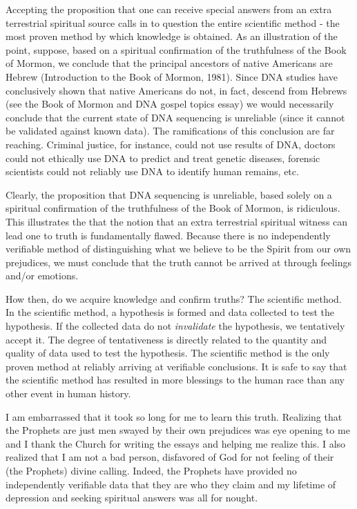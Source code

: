 \documentclass[a4paper]{article}
\begin{document}
Accepting the proposition that one can receive special answers from an extra terrestrial spiritual source calls in to question the entire scientific method - the most proven method by which knowledge is obtained.  As an illustration of the point, suppose, based on a spiritual confirmation of the truthfulness of the Book of Mormon, we conclude that the principal ancestors of native Americans are Hebrew (Introduction to the Book of Mormon, 1981).  Since DNA studies have conclusively shown that native Americans do not, in fact, descend from Hebrews (see the \textquotedbl{}Book of Mormon and DNA\textquotedbl{} gospel topics essay) we would necessarily conclude that the current state of DNA sequencing is unreliable (since it cannot be validated against \textquotedbl{}known\textquotedbl{} data).  The ramifications of this conclusion are far reaching.  Criminal justice, for instance, could not use results of DNA, doctors could not ethically use DNA to predict and treat genetic diseases, forensic scientists could not reliably use DNA to identify human remains, etc.

Clearly, the proposition that DNA sequencing is unreliable, based solely on a spiritual confirmation of the truthfulness of the Book of Mormon, is ridiculous.  This illustrates the that the notion that an extra terrestrial spiritual witness can lead one to truth is fundamentally flawed.  Because there is no independently verifiable method of distinguishing what we believe to be the Spirit from our own prejudices, we must conclude that the truth cannot be arrived at through feelings and/or emotions.

How then, do we acquire knowledge and confirm truths?  The scientific method.  In the scientific method, a hypothesis is formed and data collected to test the hypothesis.  If the collected data do not \emph{invalidate} the hypothesis, we tentatively accept it.  The degree of tentativeness is directly related to the quantity and quality of data used to test the hypothesis.  The scientific method is the only proven method at reliably arriving at verifiable conclusions.  It is safe to say that the scientific method has resulted in more blessings to the human race than any other event in human history.

I am embarrassed that it took so long for me to learn this truth.  Realizing that the Prophets are just men swayed by their own prejudices was eye opening to me and I thank the Church for writing the essays and helping me realize this.  I also realized that I am not a bad person, disfavored of God for not feeling of their (the Prophets) divine calling.  Indeed, the Prophets have provided no independently verifiable data that they are who they claim and my lifetime of depression and seeking spiritual answers was all for nought.
\end{document}
